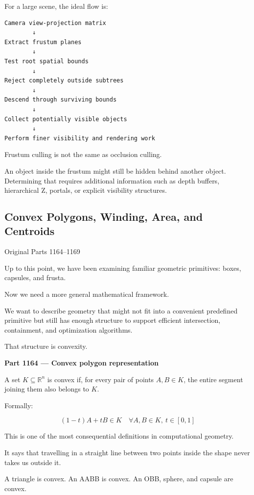 For a large scene, the ideal flow is:

\begin{verbatim}
Camera view-projection matrix
        ↓
Extract frustum planes
        ↓
Test root spatial bounds
        ↓
Reject completely outside subtrees
        ↓
Descend through surviving bounds
        ↓
Collect potentially visible objects
        ↓
Perform finer visibility and rendering work
\end{verbatim}

Frustum culling is not the same as occlusion culling.

An object inside the frustum might still be hidden behind another object. Determining that requires additional information such as depth buffers, hierarchical Z, portals, or explicit visibility structures.

\subsection{Convex Polygons, Winding, Area, and Centroids}\label{03-visual-computing-i-ch021-convex-polygons-winding-area-and-centroids}

Original Parts 1164--1169

Up to this point, we have been examining familiar geometric primitives: boxes, capsules, and frusta.

Now we need a more general mathematical framework.

We want to describe geometry that might not fit into a convenient predefined primitive but still has enough structure to support efficient intersection, containment, and optimization algorithms.

That structure is convexity.

\textbf{Part 1164 --- Convex polygon representation}

A set \(K\subseteq\mathbb R^n\) is convex if, for every pair of points \(A,B\in K\), the entire segment joining them also belongs to \(K\).

Formally:

\[
\boxed{ (1-t)A+tB\in K \quad \forall A,B\in K,\ t\in[0,1] }
\]

This is one of the most consequential definitions in computational geometry.

It says that travelling in a straight line between two points inside the shape never takes us outside it.

A triangle is convex. An AABB is convex. An OBB, sphere, and capsule are convex.

